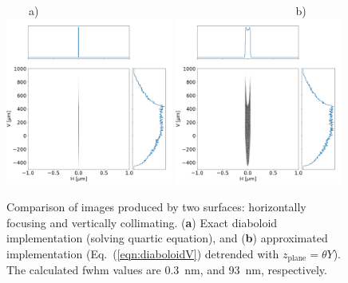 \documentclass{iucr}       %
\begin{document}
\begin{figure}
\label{fig:pointToSegment}
\flushleft
~~~~a)~~~~~~~~~~~~~~~~~~~~~~~~~~~~~~~~~~~~~~~~~~~~~~b)\\
\centering
\includegraphics[width=0.49\textwidth]{figures/p2s_V_z.png}
\includegraphics[width=0.49\textwidth]{figures/p2s_K_z.png} \\
\flushleft
\caption{Comparison of images produced by two surfaces: horizontally focusing and vertically collimating. (\textbf{a}) Exact diaboloid implementation (solving quartic equation), and (\textbf{b}) approximated implementation (Eq.~(\ref{eqn:diaboloidV}) detrended with $z_\mathrm{plane}=\theta Y$). The calculated fwhm values are \SI{0.3}{\nano\meter}, and \SI{93}{\nano\meter}, respectively.}
\end{figure}
\end{document}
